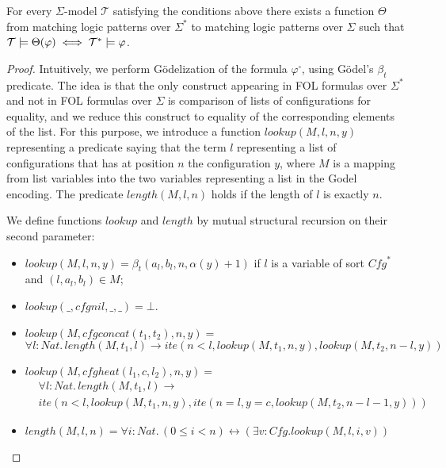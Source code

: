 \begin{theorem}\label{thm:oracleLifting}
For every $\Sigma$-model $\mathcal{T}$
satisfying the conditions above
there exists a function $\Theta$ from matching logic patterns over $\Sigma^*$
to matching logic patterns over $\Sigma$ such that
$\mathcal{T} \models \Theta(\varphi) \iff \mathcal{T^*} \models \varphi$.
\end{theorem}
\begin{proof}
Intuitively, we perform Gödelization of the formula $\varphi^\square$, using Gödel's $\beta_t$ predicate.
The idea is that the only construct appearing in FOL formulas over $\Sigma^*$ and not in FOL formulas over $\Sigma$
is comparison of lists of configurations for equality, and we reduce this construct to equality of the corresponding
elements of the list.
For this purpose, we introduce a function $\mathit{lookup}(M, l, n, y)$ representing a predicate saying that
the term $l$ representing a list of configurations that has at position $n$ the configuration $y$,
where $M$ is a mapping from list variables into the two variables representing a list in the Godel encoding.
The predicate $\mathit{length}(M, l, n)$ holds if the length of $l$ is exactly $n$.

We define functions $\mathit{lookup}$ and $\mathit{length}$ by mutual structural recursion on their second parameter:
\begin{itemize}
    \item $\mathit{lookup}(M, l, n, y) = \beta_t(a_{l}, b_{l}, n, \alpha(y)+1)$ if $l$ is a variable of sort $\mathit{Cfg}^*$ and $(l, a_{l}, b_{l}) \in M$;
    \item $\mathit{lookup}(\_, \mathit{cfgnil}, \_, \_) = \bot$.
    \item $\mathit{lookup}(M, \mathit{cfgconcat}(t_1, t_2), n, y) =$ \\
    $\forall l:\mathit{Nat}. \, \mathit{length}(M, t_1, l) \rightarrow \mathit{ite}(n < l, \mathit{lookup}(M, t_1, n, y), \mathit{lookup}(M, t_2, n-l, y))$
    \item $\mathit{lookup}(M, \mathit{cfgheat}(l_1, c, l_2), n, y) =$
    \begin{align*}
        & \forall l:\mathit{Nat}. \, \mathit{length}(M, t_1, l) \rightarrow \\
        & \mathit{ite}(n < l, \mathit{lookup}(M, t_1, n, y), \mathit{ite}(n = l, y = c, \mathit{lookup}(M, t_2, n-l-1, y)))
    \end{align*}    
    \item $\mathit{length}(M, l, n) = \forall i:\mathit{Nat}.\, (0 \leq i < n) \leftrightarrow (\exists v : \mathit{Cfg}. \mathit{lookup}(M, l, i, v))$
\end{itemize}


\end{proof}
